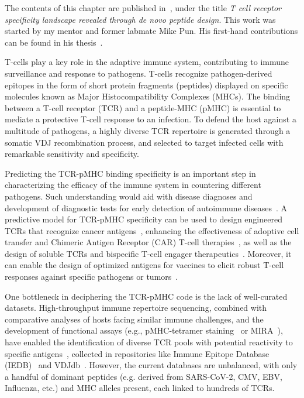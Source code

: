 
The contents of this chapter are published in~\citet{visani_t_2025}, under the title
\textit{T cell receptor specificity landscape revealed through de novo peptide design}.
This work was started by my mentor and former labmate Mike Pun.
His first-hand contributions can be found in his thesis~\citep{pun_rotationally_2023}.

T-cells play a key role in the adaptive immune system, contributing to immune surveillance and
response to pathogens. T-cells recognize pathogen-derived epitopes in the form of short protein
fragments (peptides) displayed on specific molecules known as Major Histocompatibility Complexes
(MHCs). The binding between a T-cell receptor (TCR) and a peptide-MHC (pMHC) is essential to mediate
a protective T-cell response to an infection. To defend the host against a multitude of pathogens, a
highly diverse TCR repertoire is generated through a somatic VDJ recombination process, and selected
to target infected cells with remarkable sensitivity and specificity.

Predicting the TCR-pMHC binding specificity is an important step in characterizing the efficacy of
the immune system in countering different pathogens. Such understanding would aid with disease
diagnoses and development of diagnostic tests for early detection of autoimmune
diseases~\cite{Attaf2015-tw}. A predictive model for TCR-pMHC specificity can be used to design
engineered TCRs that recognize cancer antigens~\cite{Liu2025-hl}, enhancing the effectiveness of
adoptive cell transfer and {Chimeric Antigen Receptor (CAR) T-cell}
therapies~\cite{Leidner2022-ca,Mirazee2024-bo}, as well as the design of soluble TCRs and bispecific
T-cell engager therapeutics~\cite{Hsiue2021-ag}. Moreover, it can enable the design of optimized
antigens for vaccines to elicit robust T-cell responses against specific pathogens or
tumors~\cite{Sahin2018-fv,Blass2021-jd,Rojas2023-nx}.

One bottleneck in deciphering the TCR-pMHC code is the lack of well-curated datasets.
High-throughput immune repertoire sequencing, combined with comparative analyses of hosts facing
similar immune challenges, and the development of functional assays (e.g., {pMHC-tetramer
staining}~\cite{Zhang2018-pe} or MIRA~\cite{Nolan2025-fu}), have enabled the identification of
diverse TCR pools with potential reactivity to specific antigens~\cite{Dash2017-if}, collected in
repositories like Immune Epitope Database (IEDB)~\cite{Vita2019-qn} and VDJdb~\cite{Shugay2018-nt}.
However, the current databases are unbalanced, with only a handful of dominant peptides (e.g.
derived from SARS-CoV-2, CMV, EBV, Influenza, etc.) and {MHC alleles} present, each linked to
hundreds of TCRs.

